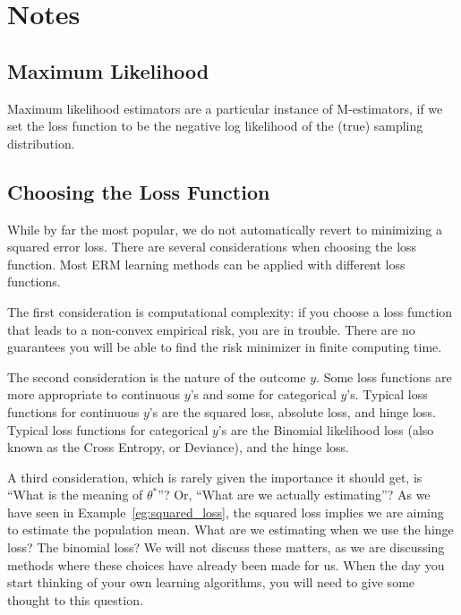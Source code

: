 \section{Notes}

\subsection{Maximum Likelihood} 
Maximum likelihood estimators are a particular instance of M-estimators, if we set the loss function to be the negative log likelihood of the (true) sampling distribution.


\subsection{Choosing the Loss Function}
While by far the most popular, we do not automatically revert to minimizing a squared error loss.
There are several considerations when choosing the loss function.
Most ERM learning methods can be applied with different loss functions. 

The first consideration is computational complexity: if you choose a loss function that leads to a non-convex empirical risk, you are in trouble. There are no guarantees you will be able to find the risk minimizer in finite computing time.

The second consideration is the nature of the outcome $y$. Some loss functions are more appropriate to continuous $y$'s and some for categorical $y$'s. Typical loss functions for continuous $y$'s are the squared loss, absolute loss, and hinge loss.
Typical loss functions for categorical $y$'s are the Binomial likelihood loss (also known as the Cross Entropy, or Deviance), and the hinge loss. 

A third consideration, which is rarely given the importance it should get, is ``What is the meaning of $\theta^*$''? Or, ``What are we actually estimating''?
As we have seen in Example~\ref{eg:squared_loss}, the squared loss implies we are aiming to estimate the population mean.
What are we estimating when we use the hinge loss? The binomial loss? 
We will not discuss these matters, as we are discussing methods where these choices have already been made for us. 
When the day you start thinking of your own learning algorithms, you will need to give some thought to this question.
